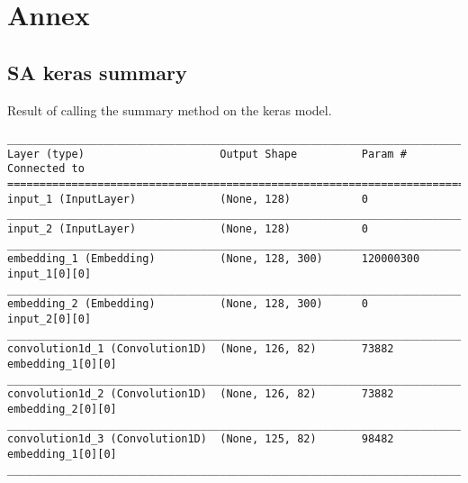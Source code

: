 \chapter*{Annex}

\section{SA keras summary}
\singlespacing

Result of calling the summary method on the keras model.

\begin{lstlisting}[basicstyle=\tiny,frame=single]
____________________________________________________________________________________________________                                                                               
Layer (type)                     Output Shape          Param #     Connected to                                                                                                                              
====================================================================================================                                                                                                         
input_1 (InputLayer)             (None, 128)           0                                              
____________________________________________________________________________________________________  
input_2 (InputLayer)             (None, 128)           0                                              
____________________________________________________________________________________________________  
embedding_1 (Embedding)          (None, 128, 300)      120000300   input_1[0][0]                      
____________________________________________________________________________________________________  
embedding_2 (Embedding)          (None, 128, 300)      0           input_2[0][0]                      
____________________________________________________________________________________________________  
convolution1d_1 (Convolution1D)  (None, 126, 82)       73882       embedding_1[0][0]                  
____________________________________________________________________________________________________  
convolution1d_2 (Convolution1D)  (None, 126, 82)       73882       embedding_2[0][0]                  
____________________________________________________________________________________________________  
convolution1d_3 (Convolution1D)  (None, 125, 82)       98482       embedding_1[0][0]                  
____________________________________________________________________________________________________  

\end{lstlisting}
